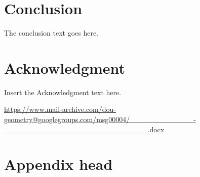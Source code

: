 \documentclass[preprint]{ptephy_v1}%
\begin{document}
\section{Conclusion}
The conclusion text goes here.

\section*{Acknowledgment}

Insert the Acknowledgment text here.


%
%
%


\let\doi\relax


\begin{thebibliography}{9}

        \url{https://www.mail-archive.com/dou-geometry@googlegroups.com/msg00004/____________-___________________________.docx}

\end{thebibliography}

\appendix

\section{Appendix head}



\end{document}
